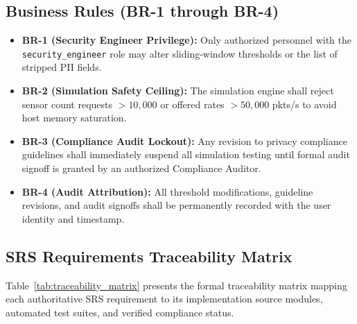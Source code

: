 \subsection{Business Rules (BR-1 through BR-4)}
\begin{itemize}
    \item \textbf{BR-1 (Security Engineer Privilege):} Only authorized personnel with the \texttt{security\_engineer} role may alter sliding-window thresholds or the list of stripped PII fields.
    \item \textbf{BR-2 (Simulation Safety Ceiling):} The simulation engine shall reject sensor count requests $> 10,000$ or offered rates $> 50,000$ pkts/s to avoid host memory saturation.
    \item \textbf{BR-3 (Compliance Audit Lockout):} Any revision to privacy compliance guidelines shall immediately suspend all simulation testing until formal audit signoff is granted by an authorized Compliance Auditor.
    \item \textbf{BR-4 (Audit Attribution):} All threshold modifications, guideline revisions, and audit signoffs shall be permanently recorded with the user identity and timestamp.
\end{itemize}

\subsection{SRS Requirements Traceability Matrix}
Table~\ref{tab:traceability_matrix} presents the formal traceability matrix mapping each authoritative SRS requirement to its implementation source modules, automated test suites, and verified compliance status.

